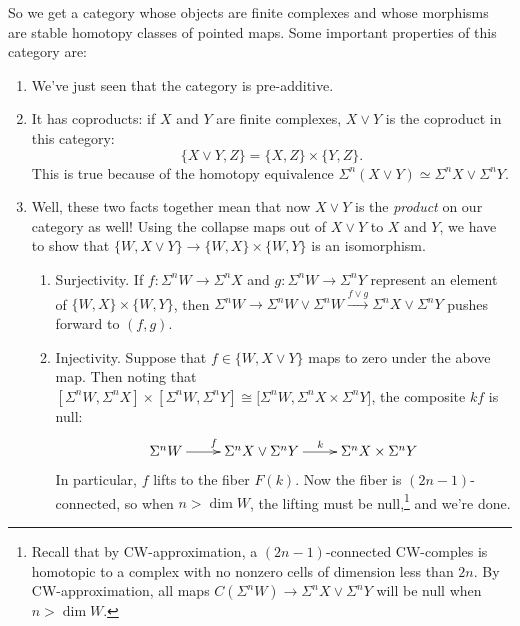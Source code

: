 \documentclass{article}
\newcommand{\wsum}{\vee}
\newcommand{\Suspend}{\Sigma}
\renewcommand{\to}{\longrightarrow}
\theoremstyle{definition}
\begin{document}
So we get a category whose objects are finite complexes and whose morphisms are stable homotopy classes of pointed maps.  Some important properties of this category are:
\begin{enumerate}
\item We've just seen that the category is pre-additive.
\item It has coproducts: if $X$ and $Y$ are finite complexes, $X \wsum Y$ is the coproduct in this category: \[\{X \wsum Y, Z\} = \{X, Z\} \times \{Y, Z\}.\]  This is true because of the homotopy equivalence $\Suspend^n(X \wsum Y) \simeq \Suspend^n X \wsum \Suspend^n Y$.
\item Well, these two facts together mean that now $X \wsum Y$ is the \emph{product} on our category as well!  Using the collapse maps out of $X \wsum Y$ to $X$ and $Y$, we have to show that $\{W, X \wsum Y\} \to \{W, X\} \times \{W, Y\}$ is an isomorphism.
\begin{enumerate}
\item Surjectivity.  If $f: \Suspend^n W \to \Suspend^n X$ and $g: \Suspend^n W \to \Suspend^n Y$ represent an element of $\{W, X\} \times \{W, Y\}$, then $\Suspend^n W \to \Suspend^n W \wsum \Suspend^n W  \stackrel{f \wsum g}{\to} \Suspend^n X \wsum \Suspend^n Y$ pushes forward to $(f, g)$.
\item Injectivity. Suppose that $f\in\{W,X\vee Y\}$ maps to zero under the above map. Then noting that $[\Suspend^n W, \Suspend^n X] \times [\Suspend^n W, \Suspend^n Y] \cong [\Suspend^n W, \Suspend^n X \times \Suspend^n Y$], the composite $kf$ is null:
\[\xymatrix{
\Suspend^n W\ar[r]^f&\Suspend^n X \wsum \Suspend^n Y\ar[r]^k&\Suspend^n X \times \Suspend^n Y
}\]
In particular, $f$ lifts to the fiber $F(k)$. Now the fiber is $(2n-1)$-connected, so when $n > \dim W$, the lifting must be null,\footnote{Recall that by CW-approximation, a $(2n-1)$-connected CW-comples is homotopic to a complex with no nonzero cells of dimension less than $2n$. By CW-approximation, all maps $C(\Sigma^n W)\to \Sigma^nX\vee\Sigma^n Y$ will be null when $n>\dim W$.} and we're done.
\end{enumerate}
\end{enumerate}
\end{document}
